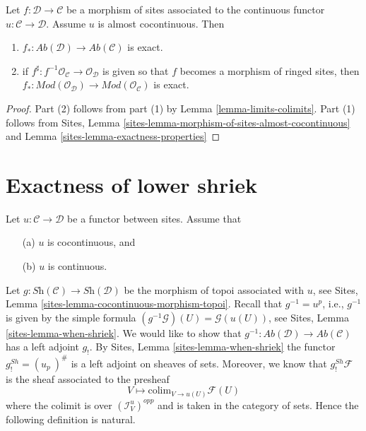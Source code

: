 \begin{lemma}
\label{lemma-morphism-ringed-sites-almost-cocontinuous}
Let $f : \mathcal{D} \to \mathcal{C}$ be a morphism of sites
associated to the continuous functor $u : \mathcal{C} \to \mathcal{D}$.
Assume $u$ is almost cocontinuous. Then
\begin{enumerate}
\item $f_* : \textit{Ab}(\mathcal{D}) \to \textit{Ab}(\mathcal{C})$ is exact.
\item if $f^\sharp : f^{-1}\mathcal{O}_\mathcal{C} \to \mathcal{O}_\mathcal{D}$
is given so that $f$ becomes a morphism of ringed sites, then
$f_* : \textit{Mod}(\mathcal{O}_\mathcal{D}) \to
\textit{Mod}(\mathcal{O}_\mathcal{C})$ is exact.
\end{enumerate}
\end{lemma}

\begin{proof}
Part (2) follows from part (1) by
Lemma \ref{lemma-limits-colimits}.
Part (1) follows from
Sites, Lemma \ref{sites-lemma-morphism-of-sites-almost-cocontinuous}
and
Lemma \ref{sites-lemma-exactness-properties}
\end{proof}





\section{Exactness of lower shriek}
\label{section-exactness-lower-shriek}

\noindent
Let $u : \mathcal{C} \to \mathcal{D}$ be a functor between sites.
Assume that
\begin{enumerate}
\item[(a)] $u$ is cocontinuous, and
\item[(b)] $u$ is continuous.
\end{enumerate}
Let $g : \textit{Sh}(\mathcal{C}) \to \textit{Sh}(\mathcal{D})$ be the
morphism of topoi associated with $u$, see
Sites, Lemma \ref{sites-lemma-cocontinuous-morphism-topoi}.
Recall that $g^{-1} = u^p$, i.e., $g^{-1}$ is given by the simple formula
$(g^{-1}\mathcal{G})(U) = \mathcal{G}(u(U))$, see
Sites, Lemma \ref{sites-lemma-when-shriek}.
We would like to show that
$g^{-1} : \textit{Ab}(\mathcal{D}) \to \textit{Ab}(\mathcal{C})$
has a left adjoint $g_!$. By
Sites, Lemma \ref{sites-lemma-when-shriek}
the functor $g^{Sh}_! = (u_p\ )^\#$ is a left adjoint on sheaves of sets.
Moreover, we know that $g^{Sh}_!\mathcal{F}$ is the sheaf
associated to the presheaf
$$
V \longmapsto \text{colim}_{V \to u(U)} \mathcal{F}(U)
$$
where the colimit is over $(\mathcal{I}_V^u)^{opp}$ and is taken in the
category of sets. Hence the following definition is natural.


